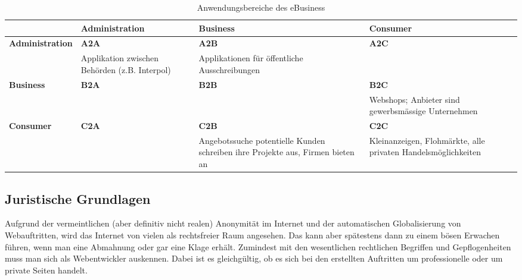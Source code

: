 \begin{table}
    \begin{center}
        \begin{tabular}[ht]{|p{3.5cm}|p{4cm}|p{4cm}|p{4cm}|}
            \hline
            \cellcolor{orange!25} &
            \cellcolor{orange!25}\textbf{Administration} &
            \cellcolor{orange!25}\textbf{Business} &
            \cellcolor{orange!25}\textbf{Consumer} \\ \hline
            \cellcolor{orange!25}\textbf{Administration} & \textbf{A2A} & \textbf{A2B} & \textbf{A2C}      \\
            \cellcolor{orange!25}                  & Applikation zwischen Behörden (z.B. Interpol)
            & Applikationen für öffentliche Ausschreibungen &      \\ \hline
            \cellcolor{orange!25}\textbf{Business} & \textbf{B2A} & \textbf{B2B} & \textbf{B2C}  \\
            \cellcolor{orange!25}                  & & & Webshops; Anbieter sind gewerbsmässige Unternehmen  \\ \hline
            \cellcolor{orange!25}\textbf{Consumer} & \textbf{C2A} & \textbf{C2B} & \textbf{C2C}  \\
            \cellcolor{orange!25}                  & & Angebotssuche potentielle Kunden schreiben ihre Projekte aus, Firmen bieten an
            & Kleinanzeigen, Flohmärkte, alle privaten Handelsmöglichkeiten \\ \hline
        \end{tabular}
    \end{center}
    \caption{Anwendungsbereiche des eBusiness}
\end{table}


\subsection{Juristische Grundlagen}
\label{subsec:juristische-grundlagen}

Aufgrund der vermeintlichen (aber definitiv nicht realen) Anonymität im
Internet und der automatischen Globalisierung von Webauftritten, wird das
Internet von vielen als rechtsfreier Raum angesehen. Das kann aber
spätestens dann zu einem bösen Erwachen führen, wenn man eine Abmahnung
oder gar eine Klage erhält. Zumindest mit den wesentlichen rechtlichen
Begriffen und Gepflogenheiten muss man sich als Webentwickler auskennen.
Dabei ist es gleichgültig, ob es sich bei den erstellten Auftritten um
professionelle oder um private Seiten handelt.

